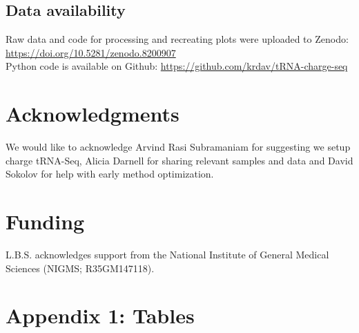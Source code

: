 \documentclass[9pt,lineno]{elife}
\begin{document}
\subsection{Data availability}
Raw data and code for processing and recreating plots were uploaded to Zenodo:
\url{https://doi.org/10.5281/zenodo.8200907}\\
Python code is available on Github:
\url{https://github.com/krdav/tRNA-charge-seq}



\section{Acknowledgments}
We would like to acknowledge Arvind Rasi Subramaniam for suggesting we setup charge tRNA-Seq, Alicia Darnell for sharing relevant samples and data and David Sokolov for help with early method optimization.



\section{Funding}
L.B.S. acknowledges support from the National Institute of General Medical Sciences (NIGMS; R35GM147118).





\appendix
\addtocounter{appendix}{1}
\label{first:app}
\section{Appendix 1: Tables}
\end{document}
